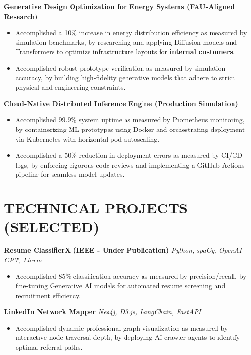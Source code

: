 \documentclass[10pt, a4paper]{article}
\begin{document}
\textbf{Generative Design Optimization for Energy Systems (FAU-Aligned Research)} 
\begin{itemize}
    \item Accomplished a 10\% increase in energy distribution efficiency as measured by simulation benchmarks, by researching and applying Diffusion models and Transformers to optimize infrastructure layouts for \textbf{internal customers}.
    \item Accomplished robust prototype verification as measured by simulation accuracy, by building high-fidelity generative models that adhere to strict physical and engineering constraints.
\end{itemize}

\textbf{Cloud-Native Distributed Inference Engine (Production Simulation)} 
\begin{itemize}
    \item Accomplished 99.9\% system uptime as measured by Prometheus monitoring, by containerizing ML prototypes using Docker and orchestrating deployment via Kubernetes with horizontal pod autoscaling.
    \item Accomplished a 50\% reduction in deployment errors as measured by CI/CD logs, by enforcing rigorous code reviews and implementing a GitHub Actions pipeline for seamless model updates.
\end{itemize}

\section{TECHNICAL PROJECTS (SELECTED)}

\textbf{Resume ClassifierX (IEEE - Under Publication)} \hfill \textit{Python, spaCy, OpenAI GPT, Llama}
\begin{itemize}
    \item Accomplished 85\% classification accuracy as measured by precision/recall, by fine-tuning Generative AI models for automated resume screening and recruitment efficiency.
\end{itemize}

\textbf{LinkedIn Network Mapper} \hfill \textit{Neo4j, D3.js, LangChain, FastAPI}
\begin{itemize}
    \item Accomplished dynamic professional graph visualization as measured by interactive node-traversal depth, by deploying AI crawler agents to identify optimal referral paths.
\end{itemize}
\end{document}
